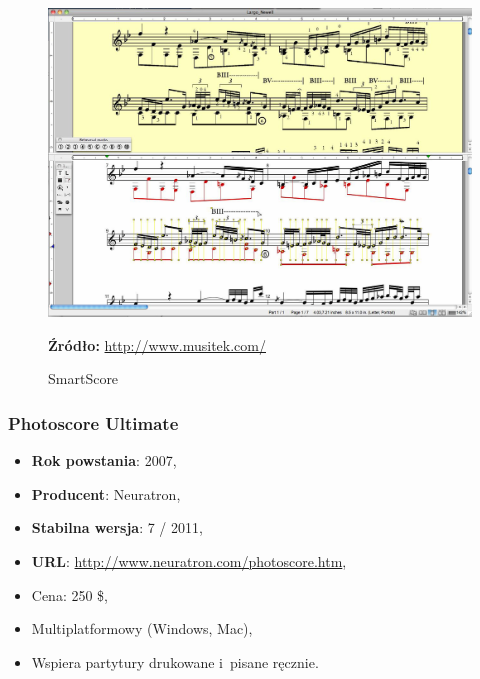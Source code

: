 \documentclass[polish,thesis,12pt]{dcsbook}
\newcommand{\source}[2]{
  	\caption*{\textbf{Źródło:} \href{#1}{{#2}}}
}
\begin{document}
\begin{figure}[H]
  \centering
  \includegraphics[scale=0.3,bb=0 0 1326 968]{img/smartscore.jpg}
  \caption{SmartScore}
  \label{smartscore}
  \source{http://www.musitek.com/smartscore-guitar.html}{http://www.musitek.com/}
\end{figure}

\subsubsection{Photoscore Ultimate}
\begin{itemize}
  \item \textbf{Rok powstania}: 2007,
  \item \textbf{Producent}: Neuratron,
  \item \textbf{Stabilna wersja}: 7 / 2011,
  \item \textbf{URL}: \url{http://www.neuratron.com/photoscore.htm},
  \item Cena: 250 \$,
  \item Multiplatformowy (Windows, Mac),
  \item Wspiera partytury drukowane i~pisane ręcznie.
\end{itemize}
\end{document}
